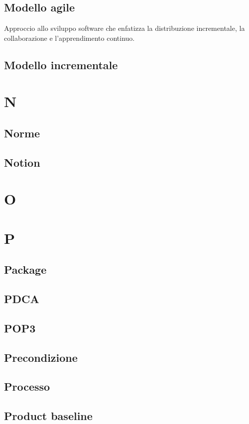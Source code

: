 \documentclass[12pt]{article}
\begin{document}
		\subsection{Modello agile}
			Approccio allo sviluppo software che enfatizza la distribuzione incrementale, la collaborazione e l'apprendimento continuo.

		\subsection{Modello incrementale}

	\clearpage
	\section{N}
		\subsection{Norme}
		\subsection{Notion}
	\clearpage
	\section{O}
	\clearpage
	\section{P}
		\subsection{Package}
		\subsection{PDCA} %
		\subsection{POP3}
		\subsection{Precondizione}
		\subsection{Processo}
		\subsection{Product baseline}
\end{document}
